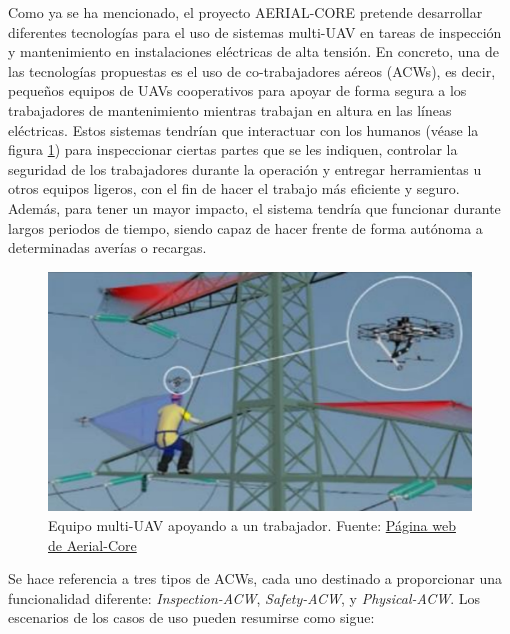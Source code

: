 \documentclass[fontsize=11pt, English=false, Español=true, Myfinal=true, twoside, numbers=noenddot]{scrbook}
\begin{document}
Como ya se ha mencionado, el proyecto AERIAL-CORE pretende desarrollar diferentes tecnologías para el uso de sistemas multi-\gls{UAV} en tareas de inspección y mantenimiento en instalaciones eléctricas de alta tensión. En concreto, una de las tecnologías propuestas es el uso de co-trabajadores aéreos (\glspl{ACW}), es decir, pequeños equipos de \glspl{UAV} cooperativos para apoyar de forma segura a los trabajadores de mantenimiento mientras trabajan en altura en las líneas eléctricas. Estos sistemas tendrían que interactuar con los humanos (véase la figura \ref{fig:aerial_co_worker}) para inspeccionar ciertas partes que se les indiquen, controlar la seguridad de los trabajadores durante la operación y entregar herramientas u otros equipos ligeros, con el fin de hacer el trabajo más eficiente y seguro. Además, para tener un mayor impacto, el sistema tendría que funcionar durante largos periodos de tiempo, siendo capaz de hacer frente de forma autónoma a determinadas averías o recargas.

\begin{figure}[htbp]
    \centering
    \includegraphics[width=.75\linewidth]
    {ProblemFormulation/figures/aerial_co_worker.jpeg}
    \caption{Equipo multi-\gls{UAV} apoyando a un trabajador. Fuente: \href{https://aerial-core.eu/}{Página web de Aerial-Core}}
    \label{fig:aerial_co_worker}
\end{figure}

Se hace referencia a tres tipos de \glspl{ACW}, cada uno destinado a proporcionar una funcionalidad diferente: \textit{Inspection-ACW}, \textit{Safety-ACW}, y \textit{Physical-ACW}. Los escenarios de los casos de uso pueden resumirse como sigue: 
\end{document}
